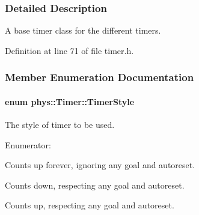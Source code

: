 \subsubsection{Detailed Description}
A base timer class for the different timers. 

Definition at line 71 of file timer.h.



\subsubsection{Member Enumeration Documentation}
\hypertarget{classphys_1_1Timer_a1ee86bf43e20329d750c5d582dcce329}{
\paragraph[{TimerStyle}]{\setlength{\rightskip}{0pt plus 5cm}enum {\bf phys::Timer::TimerStyle}}\hfill}
\label{classphys_1_1Timer_a1ee86bf43e20329d750c5d582dcce329}


The style of timer to be used. 

\begin{Desc}
\item[Enumerator: ]\par
\begin{description}
\item[{\em 
\hypertarget{classphys_1_1Timer_a1ee86bf43e20329d750c5d582dcce329a5debd5b8437d14405bf25cd9b130449f}{
Normal}
\label{classphys_1_1Timer_a1ee86bf43e20329d750c5d582dcce329a5debd5b8437d14405bf25cd9b130449f}
}]Counts up forever, ignoring any goal and autoreset. \item[{\em 
\hypertarget{classphys_1_1Timer_a1ee86bf43e20329d750c5d582dcce329a7599daa63100c2134df7d8b7c9b7f867}{
StopWatch}
\label{classphys_1_1Timer_a1ee86bf43e20329d750c5d582dcce329a7599daa63100c2134df7d8b7c9b7f867}
}]Counts down, respecting any goal and autoreset. \item[{\em 
\hypertarget{classphys_1_1Timer_a1ee86bf43e20329d750c5d582dcce329ae9b9fa35767e4ac2c87c078e1d9a0729}{
Alarm}
\label{classphys_1_1Timer_a1ee86bf43e20329d750c5d582dcce329ae9b9fa35767e4ac2c87c078e1d9a0729}
}]Counts up, respecting any goal and autoreset. \end{description}
\end{Desc}



